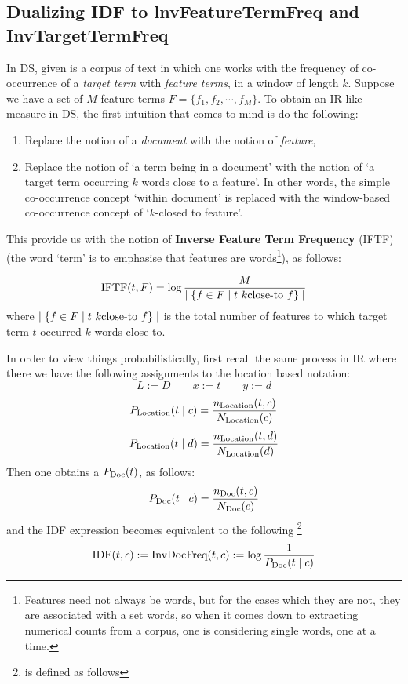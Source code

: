 \subsection{Dualizing IDF to lnvFeatureTermFreq and InvTargetTermFreq}
\label{subsec-IDF}


\medskip
In DS, given is a corpus of text in which one works with the frequency of co-occurrence of a \emph{target term} with \emph{feature terms},
in a window of length $k$.  Suppose we have a set of  $M$ feature terms  $F = \{f_1, f_2, \cdots, f_M\}$.  To obtain an IR-like measure in DS, the first intuition that comes to mind is do the following:

\begin{enumerate}
\item   Replace the notion of a  \emph{document}  with the notion of  \emph{feature}, 
\item  Replace the notion of `a term being in a document'  with the notion of `a target  term occurring $k$ words close to a feature'.  In other words,  the  simple co-occurrence concept `within document' is replaced with the window-based co-occurrence concept of  `$k$-closed to feature'. 
\end{enumerate}

This provide  us with the notion of {\bf Inverse Feature Term Frequency}  (IFTF)  (the word `term'  is to emphasise that features are words\footnote{Features need not always be words, but for the cases which they are not, they are associated with a set words, so when it comes down to extracting numerical counts from a corpus, one is considering single words, one at a time. }),   as follows:

\begin{equation}
\label{iftf}
\textmd{IFTF}(t, F) = \log{{M} \over {\mid \{f \in F \mid t  \ k\textmd{close-to} \ f \} \mid}}
\end{equation}
where $ \mid \{f \in F \mid t  \ k\textmd{close-to} \ f \} \mid$ is the total number of features to which target  term $t$ occurred $k$ words close to. 

In order to view things probabilistically, first recall the same process in IR where there we have the following assignments to the location based notation:
\[
L := D\qquad
x := t \qquad y := d
\]
\[
P_{\textmd{Location}}(t \mid c) =  \frac{n_{\textmd{Location}}(t,c)}{N_{\textmd{Location}}(c)} 
\]
\[
P_{\textmd{Location}}(t \mid d) =  \frac{n_{\textmd{Location}}(t,d)}{N_{\textmd{Location}}(d)} 
\]
Then one obtains  a $P_{\textmd{Doc}}(t)$,  as follows:
\[
P_{\textmd{Doc}}(t\mid c) = \frac{n_{\textmd{Doc}}(t,c)}{N_{\textmd{Doc}}(c)} 
\]
and the IDF expression
becomes equivalent to the following 
\footnote{is defined as follows}
\begin{equation}
\label{eqn:idf}
\textmd{IDF}(t, c) := \textmd{InvDocFreq}(t,c) := \log{\frac{1}{P_{\textmd{Doc}}(t \mid c)}}
\end{equation}



